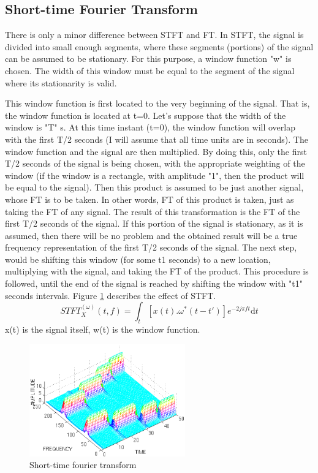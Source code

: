 \documentclass[12pt, a4paper, twoside]{report}
\begin{document}
\subsection{Short-time Fourier Transform}
There is only a minor difference between STFT and FT. In STFT, the signal is divided into small enough segments, where these segments (portions) of the signal can be assumed to be stationary. For this purpose, a window function "w" is chosen. The width of this window must be equal to the segment of the signal where its stationarity is valid.
\par
This window function is first located to the very beginning of the signal. That is, the window function is located at t=0. Let's suppose that the width of the window is "T" s. At this time instant (t=0), the window function will overlap with the first T/2 seconds (I will assume that all time units are in seconds). The window function and the signal are then multiplied. By doing this, only the first T/2 seconds of the signal is being chosen, with the appropriate weighting of the window (if the window is a rectangle, with amplitude "1", then the product will be equal to the signal). Then this product is assumed to be just another signal, whose FT is to be taken. In other words, FT of this product is taken, just as taking the FT of any signal. 
The result of this transformation is the FT of the first T/2 seconds of the signal. If this portion of the signal is stationary, as it is assumed, then there will be no problem and the obtained result will be a true frequency representation of the first T/2 seconds of the signal. 
The next step, would be shifting this window (for some t1 seconds) to a new location, multiplying with the signal, and taking the FT of the product. This procedure is followed, until the end of the signal is reached by shifting the window with "t1" seconds intervals. Figure \ref{fig:stft-3d} describes the effect of STFT.
\begin{equation}
STFT^{(\omega)}_{X}(t, f) = \int_{t}\left [ x(t) . \omega^{*}(t-t')  \right ] e^{-2j\pi ft} \text{d}t
\end{equation}
x(t) is the signal itself, w(t) is the window function.
\begin{figure}[!h]
	\centering
	\includegraphics[width=0.6\textwidth]
	{images/chapter3/stft}
	\caption{Short-time fourier transform}
	\label{fig:stft-3d}
\end{figure}
\end{document}
